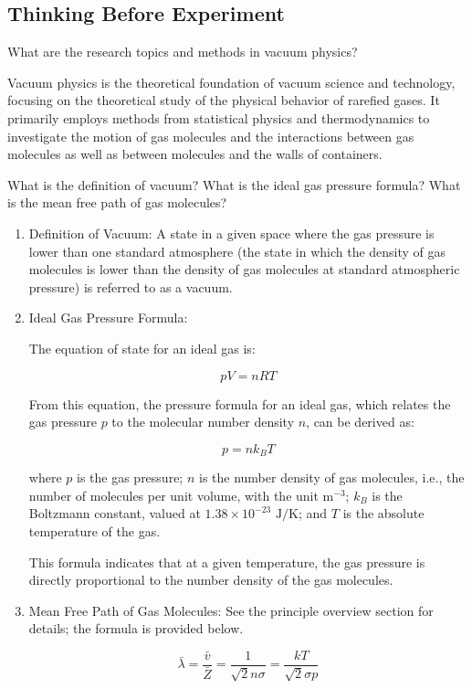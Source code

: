 \subsection{Thinking Before Experiment}

\begin{question}
	What are the research topics and methods in vacuum physics?
\end{question}

Vacuum physics is the theoretical foundation of vacuum science and technology, focusing on the theoretical study of the physical behavior of rarefied gases. It primarily employs methods from statistical physics and thermodynamics to investigate the motion of gas molecules and the interactions between gas molecules as well as between molecules and the walls of containers.

\begin{question}
	What is the definition of vacuum? What is the ideal gas pressure formula? What is the mean free path of gas molecules?
\end{question}

\begin{enumerate}
	\item Definition of Vacuum: A state in a given space where the gas pressure is lower than one standard atmosphere (the state in which the density of gas molecules is lower than the density of gas molecules at standard atmospheric pressure) is referred to as a vacuum.
	
	\item Ideal Gas Pressure Formula:
	
	The equation of state for an ideal gas is:
	
	\[
	pV = nRT
	\]
	
	From this equation, the pressure formula for an ideal gas, which relates the gas pressure \( p \) to the molecular number density \( n \), can be derived as:
	
	\[
	p = nk_BT
	\]
	
	where \( p \) is the gas pressure; \( n \) is the number density of gas molecules, i.e., the number of molecules per unit volume, with the unit \( \text{m}^{-3} \); \( k_B \) is the Boltzmann constant, valued at \( 1.38 \times 10^{-23} \text{ J/K} \); and \( T \) is the absolute temperature of the gas.
	
	This formula indicates that at a given temperature, the gas pressure is directly proportional to the number density of the gas molecules.
	
	\item Mean Free Path of Gas Molecules: See the principle overview section for details; the formula is provided below.
	
	$$
	\bar{\lambda}=\frac{\bar{v}}{\bar{Z}}=\frac{1}{\sqrt{2} n \sigma}=\frac{k T}{\sqrt{2} \sigma p}
	$$
\end{enumerate}

